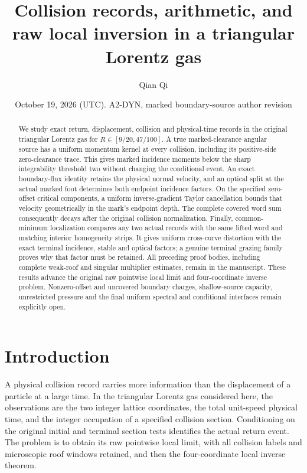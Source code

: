 \documentclass[11pt,reqno]{amsart}
\title[Collision records and raw local inversion]{Collision records, arithmetic, and raw local inversion in a triangular Lorentz gas}
\author{Qian Qi}
\date{October 19, 2026 (UTC). A2-DYN, marked boundary-source author revision}
\numberwithin{equation}{section}
\theoremstyle{definition}\newtheorem{definition}[theorem]{Definition}
\theoremstyle{remark}\newtheorem{remark}[theorem]{Remark}
\begin{document}
\raggedbottom
\begin{abstract}
We study exact return, displacement, collision and physical-time records
in the original triangular Lorentz gas for $R\in[9/20,47/100]$.
A true marked-clearance angular source has a uniform momentum kernel
at every collision, including its positive-side zero-clearance trace.
This gives marked incidence moments below the sharp integrability
threshold two without changing the conditional event.
An exact boundary-flux identity retains the physical normal velocity,
and an optical split at the actual marked foot determines both endpoint
incidence factors. On the specified zero-offset critical components,
a uniform inverse-gradient Taylor cancellation bounds that velocity
geometrically in the mark's endpoint depth. The complete covered
word sum consequently decays after the original collision normalization.
Finally, common-minimum localization compares any two actual records
with the same lifted word and matching interior homogeneity strips.
It gives uniform cross-curve distortion with the exact terminal
incidence, stable and optical factors; a genuine terminal grazing
family proves why that factor must be retained.
All preceding proof bodies, including complete weak-roof and singular
multiplier estimates, remain in the manuscript.
These results advance the original raw pointwise local limit and
four-coordinate inverse problem. Nonzero-offset and uncovered boundary
charges, shallow-source capacity, unrestricted pressure and the final
uniform spectral and conditional interfaces remain explicitly open.
\end{abstract}
\maketitle
\enlargethispage{6pt}

\section*{Introduction}
A physical collision record carries more information than the
displacement of a particle at a large time.  In the triangular
Lorentz gas considered here, the observations are the two integer
lattice coordinates, the total unit-speed physical time, and the
integer occupation of a specified collision section.  Conditioning
on the original initial and terminal section tests identifies the
actual return event.  The problem is to obtain its raw pointwise
local limit, with all collision labels and microscopic roof windows
retained, and then the four-coordinate local inverse theorem.
\end{document}
